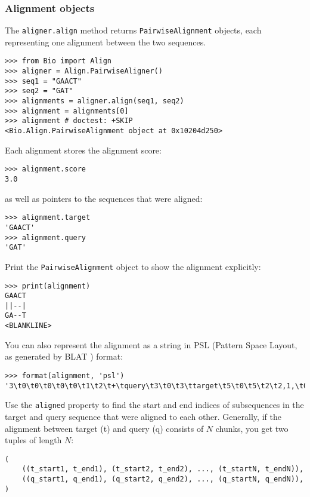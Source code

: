 \subsubsection{Alignment objects}
The \verb+aligner.align+ method returns \verb+PairwiseAlignment+ objects, each representing one alignment between the two sequences.

\begin{verbatim}
>>> from Bio import Align
>>> aligner = Align.PairwiseAligner()
>>> seq1 = "GAACT"
>>> seq2 = "GAT"
>>> alignments = aligner.align(seq1, seq2)
>>> alignment = alignments[0]
>>> alignment # doctest: +SKIP
<Bio.Align.PairwiseAlignment object at 0x10204d250>
\end{verbatim}

Each alignment stores the alignment score:

\begin{verbatim}
>>> alignment.score
3.0
\end{verbatim}
as well as pointers to the sequences that were aligned:

\begin{verbatim}
>>> alignment.target
'GAACT'
>>> alignment.query
'GAT'
\end{verbatim}

Print the \verb+PairwiseAlignment+ object to show the alignment explicitly:

\begin{verbatim}
>>> print(alignment)
GAACT
||--|
GA--T
<BLANKLINE>
\end{verbatim}

You can also represent the alignment as a string in PSL (Pattern Space Layout, as generated by BLAT \cite{kent2002}) format:

\begin{verbatim}
>>> format(alignment, 'psl')
'3\t0\t0\t0\t0\t0\t1\t2\t+\tquery\t3\t0\t3\ttarget\t5\t0\t5\t2\t2,1,\t0,2,\t0,4,\n'
\end{verbatim}

Use the \verb+aligned+ property to find the start and end indices of subsequences in the target and query sequence that were aligned to each other.
Generally, if the alignment between target (t) and query (q) consists of $N$
chunks, you get two tuples of length $N$:

\begin{verbatim}
(
    ((t_start1, t_end1), (t_start2, t_end2), ..., (t_startN, t_endN)),
    ((q_start1, q_end1), (q_start2, q_end2), ..., (q_startN, q_endN)),
)
\end{verbatim}

